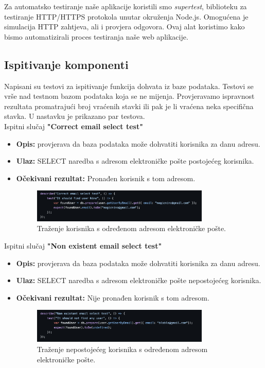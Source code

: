 			Za automatsko testiranje naše aplikacije koristili smo \textit{supertest}, biblioteku za testiranje HTTP/HTTPS protokola unutar okruženja Node.js. Omogućena je simulacija HTTP zahtjeva, ali i provjera odgovora.
			Ovaj alat koristimo kako bismo automatizirali proces testiranja naše web aplikacije.
			
			\subsection{Ispitivanje komponenti}

			Napisani su testovi za ispitivanje funkcija dohvata iz baze podataka. Testovi se vrše nad testnom bazom podataka
			koja se ne mijenja. Provjeravamo ispravnost rezultata promatrajući broj vraćenih stavki
			ili pak je li vraćena neka specifična stavka.
			U nastavku je prikazano par testova.
			\\

			Ispitni slučaj \textbf{"Correct email select test"}
			\begin{itemize}
				\item \textbf{Opis:} provjerava da baza podataka može dohvatiti korisnika za danu adresu.
				\item \textbf{Ulaz:} SELECT naredba s adresom elektroničke pošte postojećeg korisnika.
				\item \textbf{Očekivani rezultat:} Pronađen korisnik s tom adresom.
				\begin{figure}[h]
					\centering
					\includegraphics[width=0.8\textwidth]{slike/testovi/db_correct_email_test.png}
					\caption{Traženje korisnika s određenom adresom elektroničke pošte.}
					\label{fig:testovi_db}
				\end{figure}
			\end{itemize}
			\newpage


			Ispitni slučaj \textbf{"Non existent email select test"}
			\begin{itemize}
				\item \textbf{Opis:} provjerava da baza podataka može dohvatiti korisnika za danu adresu.
				\item \textbf{Ulaz:} SELECT naredba s adresom elektroničke pošte nepostojećeg korisnika.
				\item \textbf{Očekivani rezultat:} Nije pronađen korisnik s tom adresom.
				\begin{figure}[h]
					\centering
					\includegraphics[width=0.8\textwidth]{slike/testovi/db_no_email_test.png}
					\caption{Traženje nepostojećeg korisnika s određenom adresom elektroničke pošte.}
					\label{fig:testovi_db}
				\end{figure}
			\end{itemize}
			
